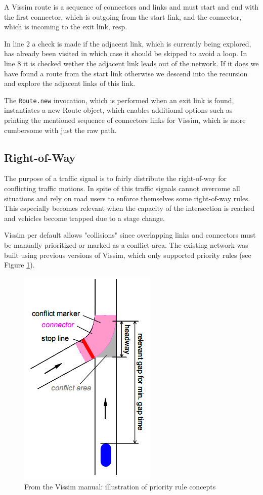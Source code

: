 A Vissim route is a sequence of connectors and links and must start and end with the first connector, which is outgoing from the start link, and the connector, which is incoming to the exit link, resp.

In line 2 a check is made if the adjacent link, which is currently being explored, has already been visited in which case it should be skipped to avoid a loop. In line 8 it is checked wether the adjacent link leads out of the network. If it does we have found a route from the start link otherwise we descend into the recursion and explore the adjacent links of this link.

The \verb|Route.new| invocation, which is performed when an exit link is found, instantiates a new Route object, which enables additional options such as printing the mentioned sequence of connectors links for Vissim, which is more cumbersome with just the raw path.

\clearpage

\subsection{Right-of-Way}
The purpose of a traffic signal is to fairly distribute the right-of-way for conflicting traffic motions.  In spite of this traffic signals cannot overcome all situations and rely on road users to enforce themselves some right-of-way rules. This especially becomes relevant when the capacity of the intersection is reached and vehicles become trapped due to a stage change.

Vissim per default allows "collisions" since overlapping links and connectors must be manually prioritized or marked as a conflict area. The existing network was built using previous versions of Vissim, which only supported priority rules (see Figure \ref{fig:priority_rules}). 

\begin{figure}[ht]
\centering
\includegraphics[scale=0.5]{priority_rules.png} 
\caption{From the Vissim manual: illustration of priority rule concepts}
\label{fig:priority_rules}
\end{figure}

